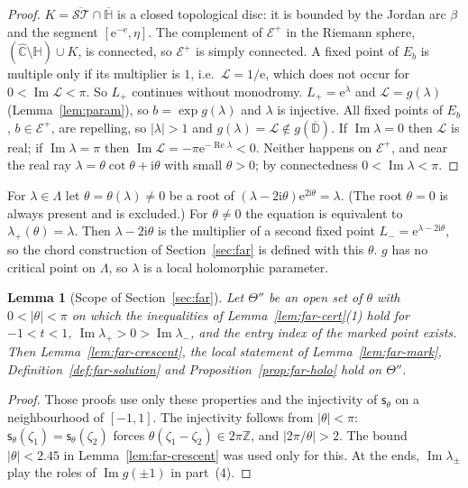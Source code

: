 \documentclass[11pt]{amsart}
\newtheorem{lemma}[theorem]{Lemma}
\theoremstyle{definition}
\newcommand{\eee}{\mathrm{e}}
\newcommand{\ii}{\mathrm{i}}
\begin{document}
\begin{proof}
$K=\overline{\mathcal{ST}}\cap\overline{\mathbb H}$ is a closed topological disc: it is bounded by the Jordan arc
$\beta$ and the segment $[\eee^{-\eee},\eta]$.  The complement of $\mathcal E^+$ in the Riemann sphere,
$(\hat{\mathbb C}\setminus\mathbb H)\cup K$, is connected, so $\mathcal E^+$ is simply connected.  A fixed point of $E_b$ is multiple only if its multiplier is
$1$, i.e.\ $\mathcal L=1/\eee$, which does not occur for $0<\operatorname{Im}\mathcal L<\pi$.  So $L_+$ continues without
monodromy.  $L_+=\eee^\lambda$ and $\mathcal L=g(\lambda)$
(Lemma~\ref{lem:param}), so $b=\exp g(\lambda)$ and $\lambda$ is injective.  All fixed points of $E_b$,
$b\in\mathcal E^+$, are repelling, so $|\lambda|>1$ and $g(\lambda)=\mathcal L\notin g(\overline{\mathbb D})$.  If $\operatorname{Im}\lambda=0$ then $\mathcal L$
is real; if $\operatorname{Im}\lambda=\pi$ then $\operatorname{Im}\mathcal L=-\pi\eee^{-\operatorname{Re}\lambda}<0$.  Neither happens on $\mathcal E^+$, and
near the real ray $\lambda=\theta\cot\theta+\ii\theta$ with small $\theta>0$; by connectedness
$0<\operatorname{Im}\lambda<\pi$.
\end{proof}

For $\lambda\in\Lambda$ let $\theta=\theta(\lambda)\ne0$ be a root of $(\lambda-2\ii\theta)\eee^{2\ii\theta}=\lambda$.  (The root $\theta=0$
is always present and is excluded.)  For $\theta\ne0$ the equation is equivalent to
$\lambda_+(\theta)=\lambda$.  Then $\lambda-2\ii\theta$ is the multiplier of a second fixed point
$L_-=\eee^{\lambda-2\ii\theta}$, so the chord construction of Section~\ref{sec:far} is defined with
this $\theta$.  $g$ has no critical point on $\Lambda$, so $\lambda$ is a local holomorphic parameter.

\begin{lemma}[Scope of Section~\ref{sec:far}]\label{lem:far-scope}
Let $\Theta''$ be an open set of $\theta$ with $0<|\theta|<\pi$ on which the inequalities of
Lemma~\ref{lem:far-cert}(1) hold for $-1<t<1$, $\operatorname{Im}\lambda_+>0>\operatorname{Im}\lambda_-$, and the entry index of the
marked point exists.  Then Lemma~\ref{lem:far-crescent}, the local statement of
Lemma~\ref{lem:far-mark}, Definition~\ref{def:far-solution} and
Proposition~\ref{prop:far-holo} hold on $\Theta''$.
\end{lemma}

\begin{proof}
Those proofs use only these properties and the injectivity of $\mathsf s_\theta$ on a
neighbourhood of $[-1,1]$.  The injectivity follows from $|\theta|<\pi$:
$\mathsf s_\theta(\zeta_1)=\mathsf s_\theta(\zeta_2)$ forces $\theta(\zeta_1-\zeta_2)\in2\pi\mathbb Z$, and $|2\pi/\theta|>2$.  The bound $|\theta|<2.45$ in
Lemma~\ref{lem:far-crescent} was used only for this.  At the ends, $\operatorname{Im}\lambda_\pm$ play the
roles of $\operatorname{Im}g(\pm1)$ in part~(4).
\end{proof}
\end{document}
